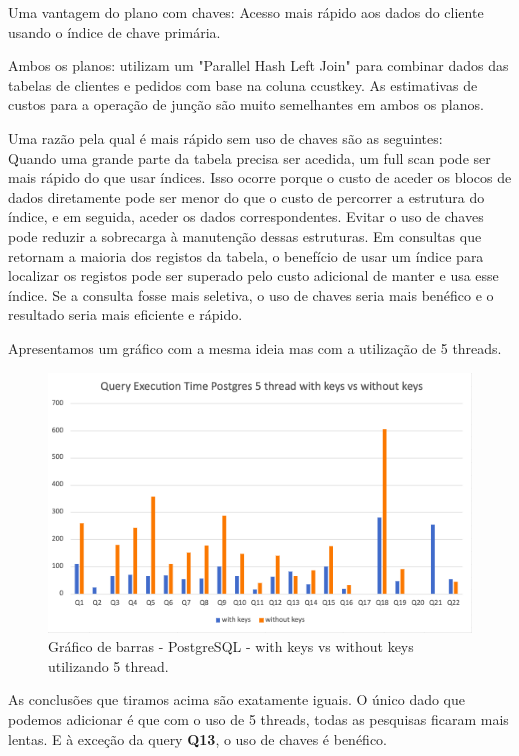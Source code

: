\documentclass{article}
\begin{document}
Uma vantagem do plano com chaves: Acesso mais rápido aos dados do cliente usando o índice de chave primária.

Ambos os planos: utilizam um "Parallel Hash Left Join" para combinar dados das tabelas de clientes e pedidos com base na coluna c\underline{}custkey. As estimativas de custos para a operação de junção são muito semelhantes em ambos os planos.

Uma razão pela qual é mais rápido sem uso de chaves são as seguintes:\\
Quando uma grande parte da tabela precisa ser acedida, um full scan pode ser mais rápido do que usar índices. Isso ocorre porque o custo de aceder os blocos de dados diretamente pode ser menor do que o custo de percorrer a estrutura do índice, e em seguida, aceder os dados correspondentes.
Evitar o uso de chaves pode reduzir a sobrecarga à manutenção dessas estruturas. Em consultas que retornam a maioria dos registos da tabela, o benefício de usar um índice para localizar os registos pode ser superado pelo custo adicional de manter e usa esse índice.
Se a consulta fosse mais seletiva, o uso de chaves seria mais benéfico e o resultado seria mais eficiente e rápido.

Apresentamos um gráfico com a mesma ideia mas com a utilização de 5 threads.

\begin{figure}[H]
  \centering
  \includegraphics[width=\textwidth]{Graphs/postgres5threads_withkeysvswithoutkeys.png}
  \caption{Gráfico de barras - PostgreSQL - with keys vs without keys utilizando 5 thread.} 
  \label{fig:PKCreation2}
\end{figure}
As conclusões que tiramos acima são exatamente iguais. O único dado que podemos adicionar é que com o uso de 5 threads, todas as pesquisas ficaram mais lentas. E à exceção da query \textbf{Q13}, o uso de chaves é benéfico.
\end{document}
